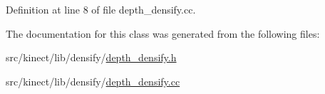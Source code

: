 Definition at line 8 of file depth\+\_\+densify.\+cc.



The documentation for this class was generated from the following files\+:\begin{DoxyCompactItemize}
\item 
src/kinect/lib/densify/\hyperlink{depth__densify_8h}{depth\+\_\+densify.\+h}\item 
src/kinect/lib/densify/\hyperlink{depth__densify_8cc}{depth\+\_\+densify.\+cc}\end{DoxyCompactItemize}
